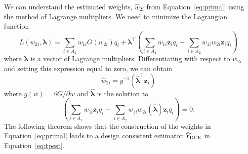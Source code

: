 \documentclass[12pt]{article}
\renewcommand{\bf}[1]{\mathbf{#1}}
\begin{document}
We can understand the estimated weights, $\hat w_{2i}$ from
Equation~\ref{eq:primal} using the method of Lagrange multipliers. We need to
minimize the Lagrangian function
\begin{equation}\label{eq:legragedc1}
  L(w_{2i}, \bm \lambda) = \sum_{i \in A_2} w_{1i} G(w_{2i}) q_i 
  + \bm \lambda^\top \left( \sum_{i \in A_1} w_{1i} \bf z_i q_i -
    \sum_{i \in A_2} w_{1i} w_{2i} \bf z_i q_i\right)
\end{equation}
where $\bm \lambda$ is a vector of Lagrange multipliers.
Differentiating with respect to $w_{2i}$ and setting this expression equal to
zero, we can obtain 
$$ \hat w_{2i} = g^{-1}(\hat{\bm \lambda}^\top \bf z_i) $$
where $g(w) = \partial G / \partial w$ and 
$\hat{\bm \lambda}$ is the solution to
\begin{equation}\label{eq:lamdc1}
  \left( \sum_{i \in A_1} w_{1i} \bf z_i q_i -
  \sum_{i \in A_2} w_{1i} w_{2i}(\hat{\bm \lambda}) \bf z_i q_i\right) = 0.
\end{equation}
The following theorem shows that the construction of the weights in
Equation~\ref{eq:primal} leads to a design consistent estimator 
$\hat Y_{\rm DCE}$ in Equation~\ref{eq:tpest}.
\end{document}
